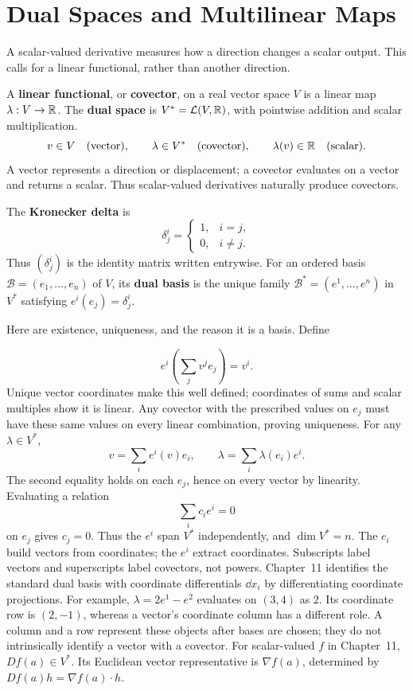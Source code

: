 \section{Dual Spaces and Multilinear Maps}
\label{sec:dual-multilinear}
A scalar-valued derivative measures how a direction changes a scalar
output. This calls for a linear functional, rather than another direction.
\begin{definition}\label{def:covector-dual}
A \textbf{linear functional}, or \textbf{covector}, on a real vector space
$V$ is a linear map $\lambda:V\to\mathbb{R}$. The \textbf{dual space} is
$V^*=\mathcal L(V,\mathbb{R})$, with pointwise addition and scalar multiplication.
\[
v\in V\quad\text{(vector)},\qquad
\lambda\in V^*\quad\text{(covector)},\qquad
\lambda(v)\in\mathbb{R}\quad\text{(scalar)}.
\]
A vector represents a direction or displacement; a covector evaluates on a
vector and returns a scalar. Thus scalar-valued derivatives naturally
produce covectors.
\end{definition}
\begin{definition}\label{def:dual-basis}
The \textbf{Kronecker delta} is
\[
\delta^i_j=\begin{cases}1,&i=j,\\0,&i\ne j.\end{cases}
\]
Thus $(\delta^i_j)$ is the identity matrix written entrywise.
For an ordered basis $\mathcal B=(e_1,\ldots,e_n)$ of $V$, its
\textbf{dual basis} is the unique family
$\mathcal B^*=(e^1,\ldots,e^n)$ in $V^*$ satisfying
$e^i(e_j)=\delta^i_j$.
\end{definition}
Here are existence, uniqueness, and the reason it is a basis. Define

\[
e^i(\sum_j v^j e_j)=v^i.
\]
 Unique vector coordinates make this well defined;
coordinates of sums and scalar multiples show it is linear. Any covector
with the prescribed values on $e_j$ must have these same values on every
linear combination, proving uniqueness. For any $\lambda\in V^*$,
\[
\boxed{v=\sum_i e^i(v)e_i,\qquad
\lambda=\sum_i\lambda(e_i)e^i.}
\]
The second equality holds on each $e_j$, hence on every vector by linearity.
Evaluating a relation
\[
\sum_i c_i e^i=0
\]
 on $e_j$ gives $c_j=0$.
Thus the $e^i$ span $V^*$ independently, and $\dim V^*=n$.
The $e_i$ build vectors from coordinates; the $e^i$ extract coordinates.
Subscripts label vectors and superscripts label covectors, not powers.
Chapter~11 identifies the standard dual basis with coordinate differentials
$\dd x_i$ by differentiating coordinate projections.
For example, $\lambda=2e^1-e^2$ evaluates on $(3,4)$ as $2$.
Its coordinate row is $(2,-1)$, whereas a vector's coordinate column has
a different role. A column and a row represent these objects after bases
are chosen; they do not intrinsically identify a vector with a covector.
For scalar-valued $f$ in Chapter~11, $Df(a)\in V^*$.
Its Euclidean vector representative is $\nabla f(a)$, determined by
$Df(a)h=\nabla f(a)\cdot h$.

